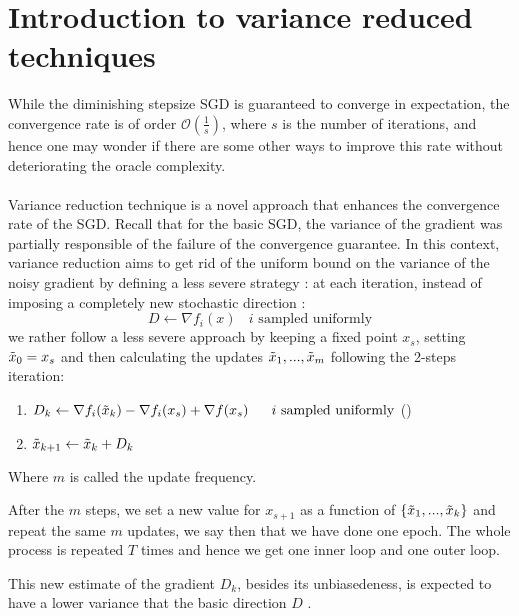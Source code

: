 \documentclass[12pt]{report}
\begin{document}
\section{Introduction to variance reduced techniques}
While the diminishing stepsize SGD is guaranteed to converge in expectation, the convergence rate is of order $\mathcal{O}(\frac{1}{s})$,  where $s$ is the number of iterations, and hence one may wonder if there are some other ways to improve this rate without deteriorating the oracle complexity.\\
\\Variance reduction technique is a novel approach that enhances the convergence rate of the SGD. Recall that for the basic SGD, the variance of the gradient was partially responsible of the failure of the convergence guarantee. In this context, variance reduction aims to get rid of the uniform bound on the variance of the noisy gradient by defining a less severe strategy : at each iteration, instead of imposing a completely new stochastic direction :
$$D\gets \nabla f_i(x)\ \ \ \ i\text{\ sampled\ uniformly}$$
we rather follow a less severe approach by keeping a fixed point $x_s$, setting $\Tilde{x}_0=x_s$ and then calculating the updates $\Tilde{x}_1,...,\Tilde{x}_m$ following the 2-steps iteration:



\begin{enumerate} 
    \item  $D_k\gets \nabla f_i(\Tilde{x}_k)-\nabla f_i(x_s)+\nabla f(x_s)\ \ \ \ \ i\text{\ sampled\ uniformly}$ 
    \hfill{}(\theequation)

    \item $\Tilde{x}_{k+1}\gets \Tilde{x}_k + D_k$
\end{enumerate}




Where $m$ is called the update frequency.

After the $m$ steps, we set a new value for $x_{s+1}$ as a function of $\{\Tilde{x}_1,...,\Tilde{x}_k\}$  and repeat the same $m$ updates, we say then that we have done one epoch. The whole process is repeated $T$ times and hence we get one inner loop and one outer loop.

This new estimate of the gradient $D_k$, besides its unbiasedeness, is expected to have a lower variance that the basic direction $D$ \cite{allen2017katyusha}.
\end{document}
